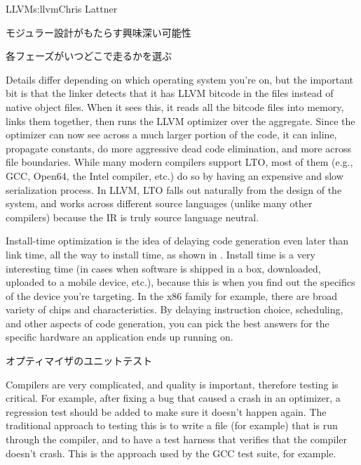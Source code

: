 \begin{aosachapter}{LLVM}{s:llvm}{Chris Lattner}
\begin{aosasect1}{モジュラー設計がもたらす興味深い可能性}
\begin{aosasect2}{各フェーズがいつどこで走るかを選ぶ}

Details differ depending on which operating system you're on, but the
important bit is that the linker detects that it has LLVM bitcode in
the  files instead of native object files.  When it sees
this, it reads all the bitcode files into memory, links them together,
then runs the LLVM optimizer over the aggregate.  Since the optimizer
can now see across a much larger portion of the code, it can inline,
propagate constants, do more aggressive dead code elimination, and
more across file boundaries.  While many modern compilers support LTO,
most of them (e.g., GCC, Open64, the Intel compiler, etc.) do so by
having an expensive and slow serialization process.  In LLVM, LTO
falls out naturally from the design of the system, and works across
different source languages (unlike many other compilers) because the
IR is truly source language neutral.

Install-time optimization is the idea of delaying code generation even
later than link time, all the way to install time, as shown in
.  Install time is a very interesting time
(in cases when software is shipped in a box, downloaded, uploaded to a
mobile device, etc.), because this is when you find out the specifics
of the device you're targeting.  In the x86 family for example, there
are broad variety of chips and characteristics.  By delaying
instruction choice, scheduling, and other aspects of code generation,
you can pick the best answers for the specific hardware an application
ends up running on.


\end{aosasect2}

\vspace{-.5cm}
\begin{aosasect2}{オプティマイザのユニットテスト}

Compilers are very complicated, and quality is important, therefore
testing is critical.  For example, after fixing a bug that caused a
crash in an optimizer, a regression test should be added to make sure
it doesn't happen again.  The traditional approach to testing this is
to write a  file (for example) that is run through the
compiler, and to have a test harness that verifies that the compiler
doesn't crash.  This is the approach used by the GCC test suite, for
example.


\end{aosasect2}
\end{aosasect1}
\end{aosachapter}
